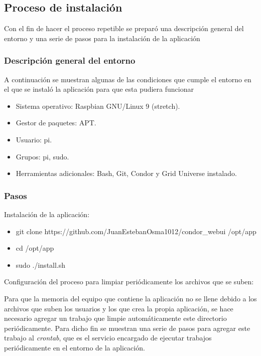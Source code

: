 \subsection{Proceso de instalación}
\noindent

Con el fin de hacer el proceso repetible se preparó una descripción general del entorno y una serie de pasos para la instalación de la aplicación

\subsubsection{Descripción general del entorno}
\noindent
A continuación se muestran algunas de las condiciones que cumple el entorno en el que se instaló la aplicación para que esta pudiera funcionar

\begin{itemize}
	\item Sistema operativo: Raspbian GNU/Linux 9 (stretch).
	\item Gestor de paquetes: APT.
	\item Usuario: pi.
	\item Grupos: pi, sudo.
	\item Herramientas adicionales: Bash, Git, Condor y Grid Universe instalado.
\end{itemize}

\subsubsection{Pasos}
\noindent

Instalación de la aplicación:

\begin{itemize}
	\item git clone https://github.com/JuanEstebanOsma1012/condor\_webui /opt/app
	\item cd /opt/app
	\item sudo ./install.sh
\end{itemize}

Configuración del proceso para limpiar periódicamente los archivos que se suben:

Para que la memoria del equipo que contiene la aplicación no se llene debido a los archivos que suben los usuarios y los que crea la propia aplicación, se hace necesario agregar un trabajo que limpie automáticamente este directorio periódicamente. Para dicho fin se muestran una serie de pasos para agregar este trabajo al \textit{crontab}, que es el servicio encargado de ejecutar trabajos periódicamente en el entorno de la aplicación.

